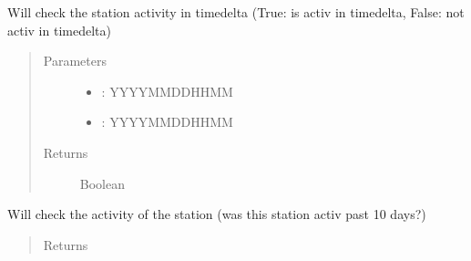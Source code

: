 \documentclass[letterpaper,10pt,english]{sphinxmanual}
\begin{document}
\begin{fulllineitems}

\begin{fulllineitems}
\label{\detokenize{DwdDataPrep:DwdDataPrep.Station.check_activ_in_date}}
\sphinxAtStartPar
{} Will check the station activity in timedelta (True: is activ in timedelta, False: not activ in timedelta)
\begin{quote}\begin{description}
\item[{Parameters}] \leavevmode\begin{itemize}
\item {} 
\sphinxAtStartPar
{} \textendash{} : YYYYMMDDHHMM

\item {} 
\sphinxAtStartPar
{} \textendash{} : YYYYMMDDHHMM

\end{itemize}

\item[{Returns}] \leavevmode
\sphinxAtStartPar
Boolean

\end{description}\end{quote}

\end{fulllineitems}


\begin{fulllineitems}
\label{\detokenize{DwdDataPrep:DwdDataPrep.Station.check_activitiy}}
\sphinxAtStartPar
{} Will check the activity of the station (was this station activ past 10 days?)
\begin{quote}\begin{description}
\item[{Returns}] \leavevmode
\sphinxAtStartPar
{}

\end{description}\end{quote}


\end{fulllineitems}
\end{fulllineitems}
\end{document}
